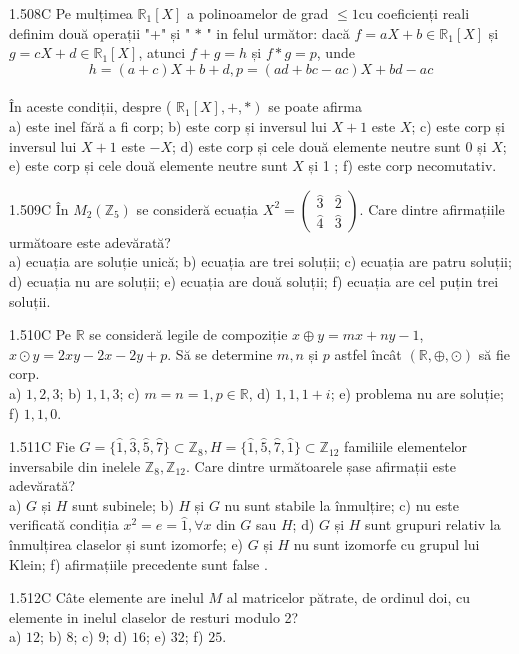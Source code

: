 \documentclass[11pt]{article}
\begin{document}
1.508C Pe mulțimea $\mathbb{R}_{1}[X]$ a polinoamelor de grad $\leq 1 \mathrm{cu}$ coeficienți reali definim două operații "+" și " $*$ " in felul următor: dacă $f=a X+b \in \mathbb{R}_{1}[X]$ și $g=c X+d \in \mathbb{R}_{1}[X]$, atunci $f+g=h$ și $f * g=p$, unde $$h=(a+c) X+b+d, p=(a d+b c-a c) X+b d-a c$$\\În aceste condiții, despre ( $\left.\mathbb{R}_{1}[X],+, *\right)$ se poate afirma\\ a) este inel fără a fi corp; b) este corp și inversul lui $X+1$ este $X$; c) este corp și inversul lui $X+1$ este $-X$; d) este corp și cele două elemente neutre sunt 0 și $X$; e) este corp și cele două elemente neutre sunt $X$ și 1 ; f) este corp necomutativ. 

1.509C În $M_{2}\left(\mathbb{Z}_{5}\right)$ se consideră ecuația $X^{2}=\left(\begin{array}{ll}\widehat{3} & \widehat{2} \\ \hat{4} & \widehat{3}\end{array}\right)$. Care dintre afirmațiile următoare este adevărată?\\ a) ecuația are soluție unică; b) ecuația are trei soluții; c) ecuația are patru soluții; d) ecuația nu are soluții; e) ecuația are două soluții; f) ecuația are cel puțin trei soluții.

1.510C Pe $\mathbb{R}$ se consideră legile de compoziție $x \oplus y=m x+n y-1$, $x \odot y=2 x y- 2 x- 2 y+p$. Să se determine $m,n$ și $p$ astfel încât $(\mathbb{R},\oplus,\odot)$ să fie corp.\\ a) $1,2,3$; b) $1,1,3$; c) $m=n=1, p \in \mathbb{R}$, d) $1,1,1+i$; e) problema nu are soluție; f) $1,1,0$.

1.511C Fie $G=\{\hat{1}, \hat{3}, \hat{5}, \hat{7}\} \subset \mathbb{Z}_{8}, H=\{\hat{1}, \hat{5}, \hat{7}, \hat{1}\} \subset \mathbb{Z}_{12}$ familiile elementelor inversabile din inelele $\mathbb{Z}_{8}, \mathbb{Z}_{12}$. Care dintre următoarele șase afirmații este adevărată?\\ a) $G$ și $H$ sunt subinele; b) $H$ și $G$ nu sunt stabile la înmulțire; c) nu este verificată condiția $x^{2}=e=\hat{1}, \forall x$ din $G$ sau $H$; d) $G$ și $H$ sunt grupuri relativ la înmulțirea claselor și sunt izomorfe; e) $G$ și $H$ nu sunt izomorfe cu grupul lui Klein; f) afirmațiile precedente sunt false .

1.512C Câte elemente are inelul $M$ al matricelor pătrate, de ordinul doi, cu elemente in inelul claselor de resturi modulo 2?\\ a) $12$; b) $8$; c) $9$; d) $16$; e) $32$; f) $25$.
\end{document}
